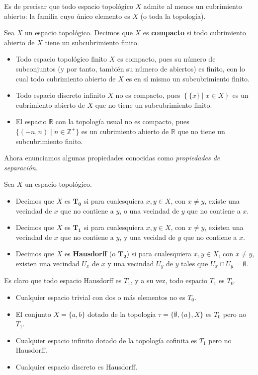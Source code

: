 Es de precisar que todo espacio topológico $X$ admite al menos un cubrimiento abierto: la familia cuyo único elemento es $X$ (o toda la topología).
\begin{Def}
   Sea $X$ un espacio topológico. Decimos que $X$ es \textbf{compacto} si todo cubrimiento abierto de $X$ tiene un subcubrimiento finito.
\end{Def}
\begin{Ejm}
   \phantom{o}
   \begin{itemize}
      \item Todo espacio topológico finito $X$ es compacto, pues su número de subconjuntos (y por tanto, también su número de abiertos) es finito, con lo cual todo cubrimiento abierto de $X$ es en sí mismo un subcubrimiento finito.
      \item Todo espacio discreto infinito $X$ no es compacto, pues $\left\lbrace \{x\}\mid x\in X\right\rbrace$ es un cubrimiento abierto de $X$ que no tiene un subcubrimiento finito.
      \item El espacio $\mathbb{R}$ con la topología usual no es compacto, pues $\{(-n,n)\mid n\in \mathbb{Z}^+\}$ es un cubrimiento abierto de $\mathbb{R}$ que no tiene un subcubrimiento finito.
   \end{itemize}
\end{Ejm}
Ahora enunciamos algunas propiedades conocidas como \textit{propiedades de separación}.
\begin{Def}
   Sea $X$ un espacio topológico.
   \begin{itemize}
      \item Decimos que $X$ es $\bm{T_0}$ si para cualesquiera $x,y\in X$, con $x\ne y$, existe una vecindad de $x$ que no contiene a $y$, o una vecindad de $y$ que no contiene a $x$. 
      \item Decimos que $X$ es $\bm{T_1}$ si para cualesquiera $x,y\in X$, con $x\ne y$, existen una vecindad de $x$ que no contiene a $y$, y una vecidad de $y$ que no contiene a $x$.
      \item Decimos que $X$ es \textbf{Hausdorff} (o $\bm{T_2}$) si para cualesquiera $x,y\in X$, con $x\ne y$, existen una vecindad $U_x$ de $x$ y una vecindad $U_y$ de $y$ tales que $U_x\cap U_y=\emptyset$.
   \end{itemize}
\end{Def}
Es claro que todo espacio Hausdorff es $T_1$, y a su vez, todo espacio $T_1$ es $T_0$.
\begin{Ejm}
   \phantom{o}
   \begin{itemize}
      \item Cualquier espacio trivial con dos o más elementos no es $T_0$.
      \item El conjunto $X=\{a,b\}$ dotado de la topología $\tau=\{\emptyset,\{a\},X\}$ es $T_0$ pero no $T_1$.
      \item Cualquier espacio infinito dotado de la topología cofinita es $T_1$ pero no Hausdorff.
      \item Cualquier espacio discreto es Hausdorff.
   \end{itemize}
\end{Ejm}
